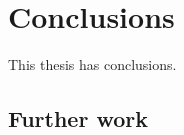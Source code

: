 \chapter{Conclusions} \label{ch:conclusions}


This thesis has conclusions.


\section{Further work} \label{sec:ag:further_work}



